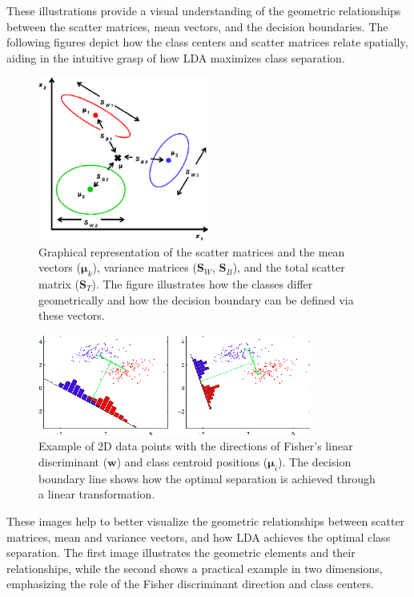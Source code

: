 \documentclass[12pt,a4paper]{article}
\begin{document}
These illustrations provide a visual understanding of the geometric relationships between the scatter matrices, mean vectors, and the decision boundaries. The following figures depict how the class centers and scatter matrices relate spatially, aiding in the intuitive grasp of how LDA maximizes class separation.\par

\begin{figure}[ht]
    \centering
    \includegraphics[width=0.5\textwidth]{images/LDA_multi_class.png}
    \caption{Graphical representation of the scatter matrices and the mean vectors ($\boldsymbol{\mu}_k$), variance matrices ($\mathbf{S}_W$, $\mathbf{S}_B$), and the total scatter matrix ($\mathbf{S}_T$). The figure illustrates how the classes differ geometrically and how the decision boundary can be defined via these vectors.~\cite{li2007fisher}}
\end{figure}


\begin{figure}[ht]
    \centering
    \includegraphics[width=0.8\textwidth]{images/LDA.png} 
    \caption{Example of 2D data points with the directions of Fisher’s linear discriminant ($\mathbf{w}$) and class centroid positions ($\boldsymbol{\mu}_i$). The decision boundary line shows how the optimal separation is achieved through a linear transformation.~\cite{li2007fisher}}
\end{figure}

These images help to better visualize the geometric relationships between scatter matrices, mean and variance vectors, and how LDA achieves the optimal class separation. The first image illustrates the geometric elements and their relationships, while the second shows a practical example in two dimensions, emphasizing the role of the Fisher discriminant direction and class centers.
\end{document}
